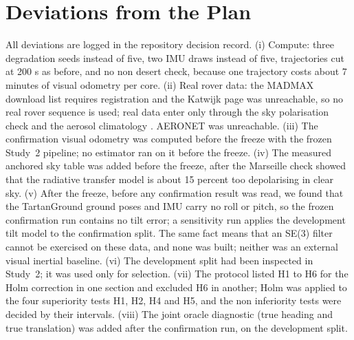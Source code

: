 \section{Deviations from the Plan}
\label{sec:deviations}
All deviations are logged in the repository decision record. (i) Compute: three degradation seeds instead of five, two IMU draws instead of five, trajectories cut at 200 s as before, and no non desert check, because one trajectory costs about 7 minutes of visual odometry per core. (ii) Real rover data: the MADMAX download list requires registration and the Katwijk page was unreachable, so no real rover sequence is used; real data enter only through the sky polarisation check \cite{poughon24} and the aerosol climatology \cite{power}. AERONET was unreachable. (iii) The confirmation visual odometry was computed before the freeze with the frozen Study~2 pipeline; no estimator ran on it before the freeze. (iv) The measured anchored sky table was added before the freeze, after the Marseille check showed that the radiative transfer model is about 15 percent too depolarising in clear sky. (v) After the freeze, before any confirmation result was read, we found that the TartanGround ground poses and IMU carry no roll or pitch, so the frozen confirmation run contains no tilt error; a sensitivity run applies the development tilt model to the confirmation split. The same fact means that an SE(3) filter cannot be exercised on these data, and none was built; neither was an external visual inertial baseline. (vi) The development split had been inspected in Study~2; it was used only for selection. (vii) The protocol listed H1 to H6 for the Holm correction in one section and excluded H6 in another; Holm was applied to the four superiority tests H1, H2, H4 and H5, and the non inferiority tests were decided by their intervals. (viii) The joint oracle diagnostic (true heading and true translation) was added after the confirmation run, on the development split.
